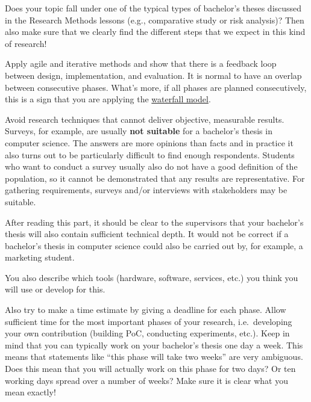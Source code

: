 \documentclass[english]{hogent-article}
\begin{document}
Does your topic fall under one of the typical types of bachelor's theses discussed in the Research Methods lessons (e.g., comparative study or risk analysis)? Then also make sure that we clearly find the different steps that we expect in this kind of research!

Apply agile and iterative methods and show that there is a feedback loop between design, implementation, and evaluation. It is normal to have an overlap between consecutive phases. What's more, if all phases are planned consecutively, this is a sign that you are applying the \href{https:/commando/en.wikipedia.org/wiki/Waterfall_model}{waterfall model}.

Avoid research techniques that cannot deliver objective, measurable results. Surveys, for example, are usually \textbf{not suitable} for a bachelor's thesis in computer science. The answers are more opinions than facts and in practice it also turns out to be particularly difficult to find enough respondents. Students who want to conduct a survey usually also do not have a good definition of the population, so it cannot be demonstrated that any results are representative. For gathering requirements, surveys and/or interviews with stakeholders may be suitable.

After reading this part, it should be clear to the supervisors that your bachelor's thesis will also contain sufficient technical depth. It would not be correct if a bachelor's thesis in computer science could also be carried out by, for example, a marketing student.

You also describe which tools (hardware, software, services, etc.) you think you will use or develop for this.

Also try to make a time estimate by giving a deadline for each phase. Allow sufficient time for the most important phases of your research, i.e.\ developing your own contribution (building PoC, conducting experiments, etc.). Keep in mind that you can typically work on your bachelor's thesis one day a week. This means that statements like ``this phase will take two weeks'' are very ambiguous. Does this mean that you will actually work on this phase for two days? Or ten working days spread over a number of weeks? Make sure it is clear what you mean exactly!

%
%
%
\end{document}
